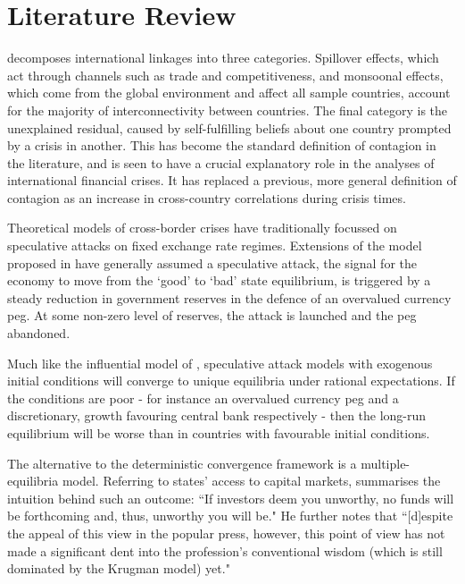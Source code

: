 \documentclass[../base.tex]{subfiles}
\begin{document}
\section{Literature Review}

\cite{masson1998contagion} decomposes international linkages into three categories. Spillover effects, which act through channels such as trade and competitiveness, and monsoonal effects, which come from the global environment and affect all sample countries, account for the majority of interconnectivity between countries. The final category is the unexplained residual, caused by self-fulfilling beliefs about one country prompted by a crisis in another. This has become the standard definition of contagion in the literature, and is seen to have a crucial explanatory role in the analyses of international financial crises. It has replaced a previous, more general definition of contagion as an increase in cross-country correlations during crisis times.


Theoretical models of cross-border crises have traditionally focussed on speculative attacks on fixed exchange rate regimes. Extensions of the model proposed in \cite{krugman1979model} have generally assumed a speculative attack, the signal for the economy to move from the `good' to `bad' state equilibrium, is triggered by a steady reduction in government reserves in the defence of an overvalued currency peg. At some non-zero level of reserves, the attack is launched and the peg abandoned.

Much like the influential model of \cite{barro1983rules}, speculative attack models with exogenous initial conditions will converge to unique equilibria under rational expectations. If the conditions are poor - for instance an overvalued currency peg and a discretionary, growth favouring central bank respectively - then the long-run equilibrium will be worse than in countries with favourable initial conditions.


The alternative to the deterministic convergence framework is a multiple-equilibria model. Referring to states' access to capital markets, \cite{calvo1995varieties} summarises the intuition behind such an outcome: ``If investors deem you unworthy, no funds will be forthcoming and, thus, unworthy you will be." He further notes that ``[d]espite the appeal of this view in the popular press, however, this point of view has not made a significant dent into the profession's conventional wisdom (which is still dominated by the Krugman model) yet."
\end{document}
